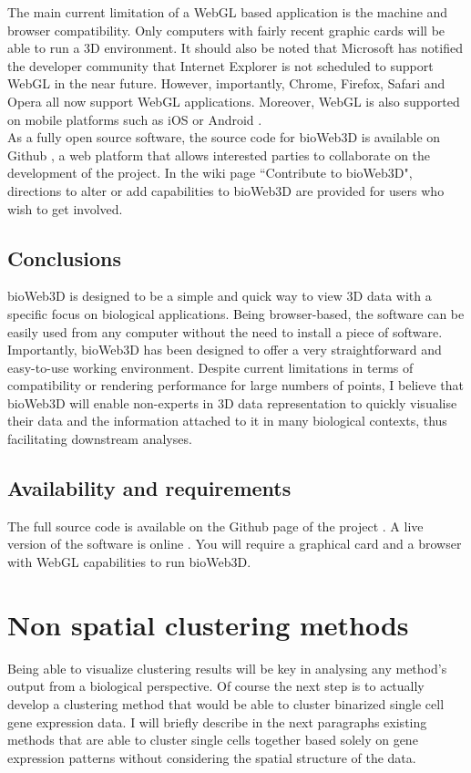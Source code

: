 The main current limitation of a WebGL based application is the machine and browser compatibility. Only computers with fairly recent graphic cards will be able to run a 3D environment. It should also be noted that Microsoft has notified the developer community that Internet Explorer is not scheduled to support WebGL in the near future. However, importantly, Chrome, Firefox, Safari and Opera all now support WebGL applications. Moreover, WebGL is also supported on mobile platforms such as iOS or Android \cite{caniuse}.\\


As a fully open source software, the source code for bioWeb3D is available on Github \cite{github}, a web platform that allows interested parties to collaborate on the development of the project. In the wiki page ``Contribute to bioWeb3D", directions to alter or add capabilities to bioWeb3D are provided for users who wish to get involved.

	\subsection{Conclusions}
bioWeb3D is designed to be a simple and quick way to view 3D data with a specific focus on biological applications.  Being browser-based, the software can be easily used from any computer without the need to install a piece of software. Importantly, bioWeb3D has been designed to offer a very straightforward and easy-to-use working environment. Despite current limitations in terms of compatibility or rendering performance for large numbers of points, I believe that bioWeb3D will enable non-experts in 3D data representation to quickly visualise their data and the information attached to it in many biological contexts, thus facilitating downstream analyses.

	\subsection{Availability and requirements}
The full source code is available on the Github page of the project \cite{github}. A live version of the software is online \cite{bioWeb3D}. You will require a graphical card and a browser with WebGL capabilities to run bioWeb3D.

\section{Non spatial clustering methods}
Being able to visualize clustering results will be key in analysing any method's output from a biological perspective. Of course the next step is to actually develop a clustering method that would be able to cluster binarized single cell gene expression data. I will briefly describe in the next paragraphs existing methods that are able to cluster single cells together based solely on gene expression patterns without considering the spatial structure of the data.
